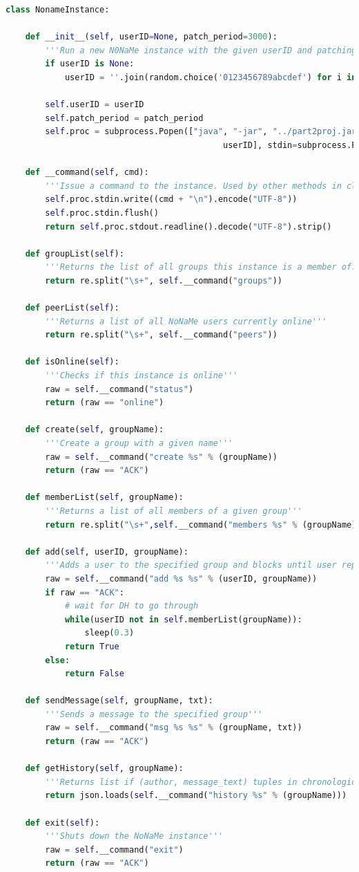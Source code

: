 \documentclass[a4paper, 12pt]{report}
\begin{document}
\begin{lstlisting}[language = Python, columns=fullflexible, basicstyle=\scriptsize\ttfamily]
class NonameInstance:

    def __init__(self, userID=None, patch_period=3000):
        '''Run a new N0NaMe instance with the given userID and patching period'''
        if userID is None:
            userID = ''.join(random.choice('0123456789abcdef') for i in range(10))

        self.userID = userID
        self.patch_period = patch_period
        self.proc = subprocess.Popen(["java", "-jar", "../part2proj.jar", "-m", str(patch_period), 
                                            userID], stdin=subprocess.PIPE, stdout=subprocess.PIPE)

    def __command(self, cmd):
        '''Issue a command to the instance. Used by other methods in class.'''
        self.proc.stdin.write((cmd + "\n").encode("UTF-8"))
        self.proc.stdin.flush()
        return self.proc.stdout.readline().decode("UTF-8").strip()

    def groupList(self):
        '''Returns the list of all groups this instance is a member of.'''
        return re.split("\s+", self.__command("groups"))

    def peerList(self):
        '''Returns a list of all NoNaMe users currently online'''
        return re.split("\s+", self.__command("peers"))

    def isOnline(self):
        '''Checks if this instance is online'''
        raw = self.__command("status")
        return (raw == "online")

    def create(self, groupName):
        '''Create a group with a given name'''
        raw = self.__command("create %s" % (groupName))
        return (raw == "ACK")

    def memberList(self, groupName):
        '''Returns a list of all members of a given group'''
        return re.split("\s+",self.__command("members %s" % (groupName)))

    def add(self, userID, groupName):
        '''Adds a user to the specified group and blocks until user replies'''
        raw = self.__command("add %s %s" % (userID, groupName))
        if raw == "ACK":
            # wait for DH to go through
            while(userID not in self.memberList(groupName)):
                sleep(0.3)
            return True
        else:
            return False

    def sendMessage(self, groupName, txt):
        '''Sends a message to the specified group'''
        raw = self.__command("msg %s %s" % (groupName, txt))
        return (raw == "ACK")
        
    def getHistory(self, groupName):
        '''Returns list if (author, message_text) tuples in chronological order'''
        return json.loads(self.__command("history %s" % (groupName)))

    def exit(self):
        '''Shuts down the NoNaMe instance'''
        raw = self.__command("exit")
        return (raw == "ACK")
\end{lstlisting}
\end{document}
